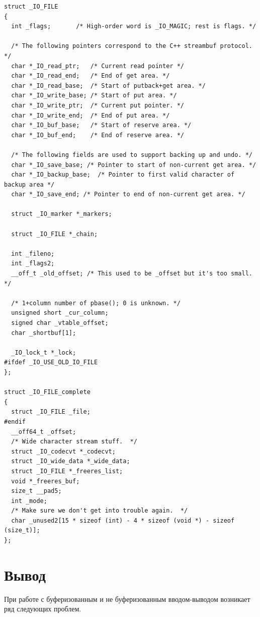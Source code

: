 \begin{center}
    \captionsetup{justification=raggedright,singlelinecheck=off}
    \begin{lstlisting}[label=lst:IO\_FILE,caption=Описание структуры \_IO\_FILE в файле /usr/include/x86\_64-linux-gnu/bits/struct\_FILE.h]
struct _IO_FILE
{
  int _flags;		/* High-order word is _IO_MAGIC; rest is flags. */

  /* The following pointers correspond to the C++ streambuf protocol. */
  char *_IO_read_ptr;	/* Current read pointer */
  char *_IO_read_end;	/* End of get area. */
  char *_IO_read_base;	/* Start of putback+get area. */
  char *_IO_write_base;	/* Start of put area. */
  char *_IO_write_ptr;	/* Current put pointer. */
  char *_IO_write_end;	/* End of put area. */
  char *_IO_buf_base;	/* Start of reserve area. */
  char *_IO_buf_end;	/* End of reserve area. */

  /* The following fields are used to support backing up and undo. */
  char *_IO_save_base; /* Pointer to start of non-current get area. */
  char *_IO_backup_base;  /* Pointer to first valid character of backup area */
  char *_IO_save_end; /* Pointer to end of non-current get area. */

  struct _IO_marker *_markers;

  struct _IO_FILE *_chain;

  int _fileno;
  int _flags2;
  __off_t _old_offset; /* This used to be _offset but it's too small.  */

  /* 1+column number of pbase(); 0 is unknown. */
  unsigned short _cur_column;
  signed char _vtable_offset;
  char _shortbuf[1];

  _IO_lock_t *_lock;
#ifdef _IO_USE_OLD_IO_FILE
};

struct _IO_FILE_complete
{
  struct _IO_FILE _file;
#endif
  __off64_t _offset;
  /* Wide character stream stuff.  */
  struct _IO_codecvt *_codecvt;
  struct _IO_wide_data *_wide_data;
  struct _IO_FILE *_freeres_list;
  void *_freeres_buf;
  size_t __pad5;
  int _mode;
  /* Make sure we don't get into trouble again.  */
  char _unused2[15 * sizeof (int) - 4 * sizeof (void *) - sizeof (size_t)];
};
\end{lstlisting}
\end{center}

\chapter{Вывод}

При работе с буферизованным и не буферизованным вводом-выводом возникает ряд следующих проблем.

